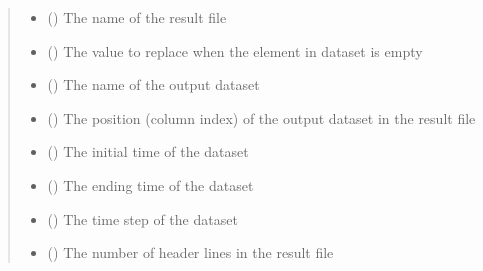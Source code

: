 \documentclass[letterpaper,10pt,english]{sphinxmanual}
\begin{document}
\begin{fulllineitems}
\begin{fulllineitems}
\begin{quote}
\begin{description}
\begin{itemize}
\item {} 
 () \textendash{} The name of the result file

\item {} 
 () \textendash{} The value to replace when the element in dataset is empty

\item {} 
 () \textendash{} The name of the output dataset

\item {} 
 () \textendash{} The position (column index) of the output dataset in the result file

\item {} 
 () \textendash{} The initial time of the dataset

\item {} 
 () \textendash{} The ending time of the dataset

\item {} 
 () \textendash{} The time step of the dataset

\item {} 
 () \textendash{} The number of header lines in the result file

\end{itemize}

\end{description}\end{quote}


\end{fulllineitems}
\end{fulllineitems}
\end{document}
